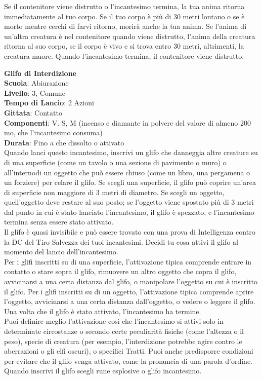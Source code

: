 \begin{multicols}{2}
Se il contenitore viene distrutto o l'incantesimo termina, la tua anima ritorna immediatamente al tuo corpo. Se il tuo corpo è più di 30 metri lontano o se è morto mentre cerchi di farvi ritorno, morirà anche la tua anima. Se l'anima di un'altra creatura è nel contenitore quando viene distrutto, l'anima della creatura ritorna al suo corpo, se il corpo è vivo e si trova entro 30 metri, altrimenti, la creatura muore. Quando l'incantesimo termina, il contenitore viene distrutto.

\medskip\textbf{Glifo di Interdizione}\\
\textbf{Scuola}: Abiurazione\\
\textbf{Livello}: 3, Comune\\
\textbf{Tempo di Lancio}: 2 Azioni\\
\textbf{Gittata}: Contatto\\
\textbf{Componenti}: V. S, M (incenso e diamante in polvere del valore di almeno 200 mo, che l'incantesimo consuma)\\
\textbf{Durata}: Fino a che dissolto o attivato \\
Quando lanci questo incantesimo, inscrivi un glifo che danneggia altre creature su di una superficie (come un tavolo o una sezione di pavimento o muro) o all'internodi un oggetto che può essere chiuso (come un libro, una pergamena o un forziere) per celare il glifo. Se scegli una superficie, il glifo può coprire un'area di superficie non maggiore di 3 metri di diametro. Se scegli un oggetto, quell'oggetto deve restare al suo posto; se l'oggetto viene spostato più di 3 metri dal punto in cui è stato lanciato l'incantesimo, il glifo è spezzato, e l'incantesimo termina senza essere stato attivato.\\
Il glifo è quasi invisibile e può essere trovato con una prova di Intelligenza contro la DC del Tiro Salvezza dei tuoi incantesimi. Decidi tu cosa attivi il glifo al momento del lancio dell'incantesimo.\\
Per i glifi inscritti su di una superficie, l'attivazione tipica comprende entrare in contatto o stare sopra il glifo, rimuovere un altro oggetto che copra il glifo, avvicinarsi a una certa distanza dal glifo, o manipolare l'oggetto su cui è inscritto il glifo. Per i glifi inscritti su di un oggetto, l'attivazione tipica comprende aprire l'oggetto, avvicinarsi a una certa distanza dall'oggetto, o vedere o leggere il glifo. Una volta che il glifo è stato attivato, l'incantesimo ha termine.\\
Puoi definire meglio l'attivazione così che l'incantesimo si attivi solo in determinate circostanze o secondo certe peculiarità fisiche (come l'altezza o il peso), specie di creatura (per esempio, l'interdizione potrebbe agire contro le aberrazioni o gli elfi oscuri), o specifici Tratti. Puoi anche predisporre condizioni per evitare che il glifo venga attivato, come la pronuncia di una parola d'ordine.\\
Quando inscrivi il glifo scegli rune esplosive o glifo incantesimo.


\end{multicols}
